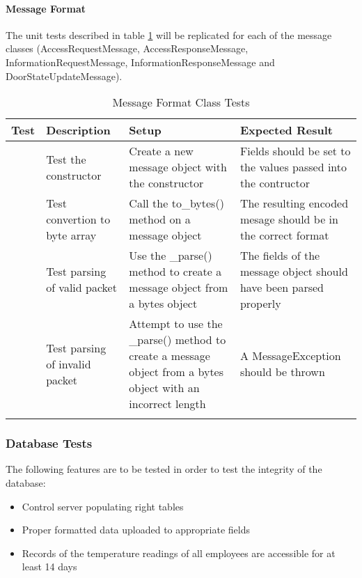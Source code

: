 \paragraph{Message Format}

The unit tests described in table \ref{table:msg-frmt-tests} will be replicated
for each of the message classes (AccessRequestMessage, AccessResponseMessage,
InformationRequestMessage, InformationResponseMessage and
DoorStateUpdateMessage).

\begin{longtable}[htb]{>{\centering\arraybackslash}m{0.75cm}|>{\centering\arraybackslash}m{4cm}|>{\centering\arraybackslash}m{4.5cm}|>{\centering\arraybackslash}m{4cm}}
\toprule
Test & Description & Setup & Expected Result \\
\midrule
1 & Test the constructor & Create a new message object with the constructor &
Fields should be set to the values passed into the contructor \\
\hline
2 & Test convertion to byte array & Call the to\_bytes() method on a message
object & The resulting encoded mesage should be in the correct format \\
\hline
3 & Test parsing of valid packet & Use the \_parse() method to create a message
object from a bytes object & The fields of the message object should have been
parsed properly \\
\hline
4 & Test parsing of invalid packet & Attempt to use the \_parse() method to
create a message object from a bytes object with an incorrect length & A
MessageException should be thrown \\
\bottomrule
\caption{Message Format Class Tests}
\label{table:msg-frmt-tests}
\end{longtable}

\subsubsection{Database Tests}

The following features are to be tested in order to test the integrity of the
database:

\begin{itemize}
    \item Control server populating right tables 
    \item Proper formatted data uploaded to appropriate fields
    \item Records of the temperature readings of all employees are accessible
          for at least 14 days
\end{itemize}

